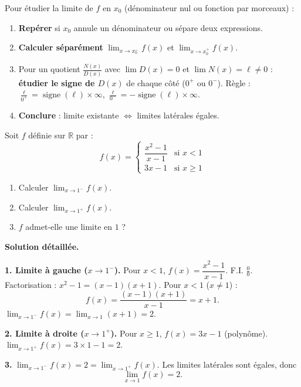 \documentclass[11pt]{article}
\begin{document}
\begin{methode}
Pour étudier la limite de $f$ en $x_0$ (dénominateur nul ou fonction par morceaux) :
\begin{enumerate}
\item \textbf{Repérer} si $x_0$ annule un dénominateur ou sépare deux expressions.
\item \textbf{Calculer séparément} $\displaystyle\lim_{x\to x_0^-} f(x)$ et $\displaystyle\lim_{x\to x_0^+} f(x)$.
\item Pour un quotient $\frac{N(x)}{D(x)}$ avec $\lim D(x)=0$ et $\lim N(x)=\ell\neq 0$ : \textbf{étudier le signe de $D(x)$} de chaque côté ($0^+$ ou $0^-$). Règle : $\frac{\ell}{0^+}=\operatorname{signe}(\ell)\times\infty$, $\frac{\ell}{0^-}=-\operatorname{signe}(\ell)\times\infty$.
\item \textbf{Conclure} : limite existante $\iff$ limites latérales égales.
\end{enumerate}
\end{methode}

\begin{exoresolu}
Soit $f$ définie sur $\mathbb{R}$ par :
\[f(x)=\begin{cases} \dfrac{x^2-1}{x-1} & \text{si } x<1 \\[6pt] 3x-1 & \text{si } x\geq 1 \end{cases}\]
\begin{enumerate}
\item Calculer $\displaystyle\lim_{x\to 1^-} f(x)$.
\item Calculer $\displaystyle\lim_{x\to 1^+} f(x)$.
\item $f$ admet-elle une limite en $1$ ?
\end{enumerate}
\tcblower
\textbf{Solution détaillée.}

\textbf{1. Limite à gauche ($x\to 1^-$).} Pour $x<1$, $f(x)=\dfrac{x^2-1}{x-1}$. F.I. $\frac{0}{0}$.
Factorisation : $x^2-1=(x-1)(x+1)$. Pour $x<1$ ($x\neq 1$) :
\[f(x)=\frac{(x-1)(x+1)}{x-1}=x+1.\]
$\displaystyle\lim_{x\to 1^-} f(x)=\lim_{x\to 1}(x+1)=2.$

\textbf{2. Limite à droite ($x\to 1^+$).} Pour $x\geq 1$, $f(x)=3x-1$ (polynôme).
$\displaystyle\lim_{x\to 1^+} f(x)=3\times 1-1=2.$

\textbf{3.} $\displaystyle\lim_{x\to 1^-} f(x)=2=\lim_{x\to 1^+} f(x)$. Les limites latérales sont égales, donc
\[\lim_{x\to 1} f(x)=2.\]
\end{exoresolu}
\end{document}
